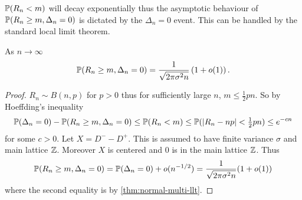 $\P(R_n < m)$ will decay exponentially thus the asymptotic behaviour of $\P(R_n \geq m, \Delta_n = 0)$ is dictated by the $\Delta_n = 0$ event. This can be handled by the standard local limit theorem.
\begin{lemma}
    \label{lem:normal-llt}
    As $n \to \infty$
    \begin{equation*}
        \P(R_n \geq m, \Delta_n = 0) = \frac{1}{\sqrt{2 \pi \sigma^2 n}} \left( 1 + \littleo(1) \right).
    \end{equation*}
\end{lemma}
\begin{proof}
    $R_n \sim B(n, p)$ for $p > 0$ thus for sufficiently large $n$, $m \leq \frac{1}{2} pn$. So by Hoeffding's inequality
    \begin{equation*}
        \P(\Delta_n = 0) - \P(R_n \geq m, \Delta_n = 0) \leq \P(R_n < m) \leq \P(\abs{R_n - np} < \tfrac{1}{2}pn) \leq e^{-cn}
    \end{equation*}
    for some $c > 0$.  Let $X = D^- - D^+$. This is assumed to have finite variance $\sigma$ and main lattice $\Z$. Moreover $X$ is centered and $0$ is in the main lattice $\Z$. Thus
    \begin{equation*}
        \P(R_n \geq m, \Delta_n = 0) = \P(\Delta_n = 0) + \littleo(n^{-1/2}) = \frac{1}{\sqrt{2 \pi \sigma^2 n}}(1 + \littleo(1))
    \end{equation*}
    where the second equality is by \cref{thm:normal-multi-llt}.
\end{proof}

